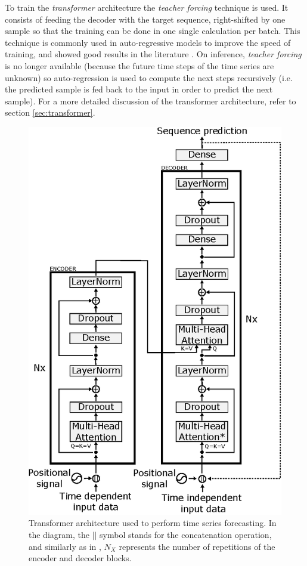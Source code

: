 To train the \textit{transformer} architecture the \textit{teacher forcing} technique \autocite{williams1989, Goyal2016} is used. It consists of feeding the decoder with the target sequence, right-shifted by one sample so that the training can be done in one single calculation per batch. This technique is commonly used in auto-regressive models to improve the speed of training, and showed good results in the literature \autocite{vaswani2017}. On inference, \textit{teacher forcing} is no longer available (because the future time steps of the time series are unknown) so auto-regression is used to compute the next steps recursively (i.e. the predicted sample is fed back to the input in order to predict the next sample). For a more detailed discussion of the transformer architecture, refer to section \ref{sec:transformer}.

\begin{figure}[h!]
   	\centering
   	\includegraphics[width=0.7\linewidth]{salesforecast/images/transformer}
   	\caption{Transformer architecture used to perform time series forecasting. In the diagram, the $||$ symbol stands for the concatenation operation, and similarly as in \autocite{vaswani2017}, $N_X$ represents the number of repetitions of the encoder and decoder blocks.}
   	\label{fig:salesforecast_transformer}
\end{figure}

